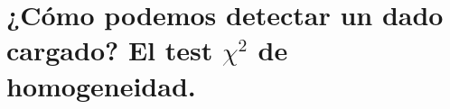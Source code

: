 \begin{itemize}





\end{itemize}












\section{¿Cómo podemos detectar un dado cargado? El test $\chi^2$ de homogeneidad.}

